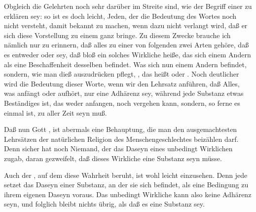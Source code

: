 \begin{aufza} 
\item Obgleich die Gelehrten noch sehr darüber im Streite sind, wie der Begriff einer  zu erklären sey: so ist es doch leicht, Jeden, der die Bedeutung des Wortes noch nicht versteht, damit bekannt zu machen, wenn dazu nicht verlangt wird, daß er sich diese Vorstellung zu einem ganz  bringe. Zu diesem Zwecke brauche ich nämlich nur zu erinnern, daß alles  zu einer von folgenden zwei Arten gehöre, daß es entweder  oder  sey, daß  bloß ein solches Wirkliche heiße, das sich  einem Andern als eine Beschaffenheit desselben befindet. Was sich nun  einem Andern befindet, sondern, wie man dieß auszudrücken pflegt, , das heißt  oder . Noch deutlicher wird die Bedeutung dieser Worte, wenn wir den Lehrsatz anführen, daß Alles, was anfängt oder aufhört, nur eine Adhärenz sey, während jede Substanz etwas Beständiges ist, das weder anfangen, noch vergehen kann, sondern, so ferne es einmal ist, zu aller Zeit seyn muß.
\item Daß nun Gott , ist abermals eine Behauptung, die man den ausgemachtesten Lehrsätzen der natürlichen Religion des Menschengeschlechtes beizählen darf. Denn sicher hat noch Niemand, der das Daseyn eines unbedingt Wirklichen zugab, daran gezweifelt, daß dieses Wirkliche eine Substanz seyn müsse.
\item Auch der , auf dem diese Wahrheit beruht, ist wohl leicht einzusehen. Denn jede  setzet das Daseyn einer Substanz, an der sie sich befindet, als eine Bedingung zu ihrem eigenen Daseyn voraus. Das unbedingt Wirkliche kann also keine Adhärenz seyn, und folglich bleibt nichts übrig, als daß es eine Substanz sey.
\end{aufza}

